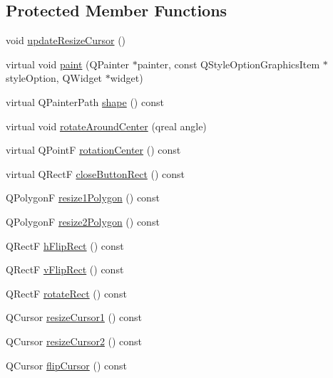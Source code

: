 \subsection*{Protected Member Functions}
\begin{DoxyCompactItemize}
\item 
void \hyperlink{class_u_b_graphics_triangle_a44af671b51e650fbe4a6b8b0c05490d5}{update\-Resize\-Cursor} ()
\item 
virtual void \hyperlink{class_u_b_graphics_triangle_a81a8a1a685d90d83734417474aea694c}{paint} (Q\-Painter $\ast$painter, const Q\-Style\-Option\-Graphics\-Item $\ast$style\-Option, Q\-Widget $\ast$widget)
\item 
virtual Q\-Painter\-Path \hyperlink{class_u_b_graphics_triangle_a3245270b719aa6dcfa30d16c999a596e}{shape} () const 
\item 
virtual void \hyperlink{class_u_b_graphics_triangle_a38e19f6246c3c232351336071972a6be}{rotate\-Around\-Center} (qreal angle)
\item 
virtual Q\-Point\-F \hyperlink{class_u_b_graphics_triangle_a5b16d87a6956152ef68dc904b4cdfff2}{rotation\-Center} () const 
\item 
virtual Q\-Rect\-F \hyperlink{class_u_b_graphics_triangle_a77e4143cf4dc0227f54cad19396cf5de}{close\-Button\-Rect} () const 
\item 
Q\-Polygon\-F \hyperlink{class_u_b_graphics_triangle_ab0db9ca924984128cf70ea0c705a5564}{resize1\-Polygon} () const 
\item 
Q\-Polygon\-F \hyperlink{class_u_b_graphics_triangle_a2904862c9e4c9efe31348c72821a78ff}{resize2\-Polygon} () const 
\item 
Q\-Rect\-F \hyperlink{class_u_b_graphics_triangle_a2e916ebdfb65d98385f82ba172e23d89}{h\-Flip\-Rect} () const 
\item 
Q\-Rect\-F \hyperlink{class_u_b_graphics_triangle_a7ccf8132bbd0649e94dc8a1d3968f19e}{v\-Flip\-Rect} () const 
\item 
Q\-Rect\-F \hyperlink{class_u_b_graphics_triangle_a19d6ee24797f5198b86b053df1896a09}{rotate\-Rect} () const 
\item 
Q\-Cursor \hyperlink{class_u_b_graphics_triangle_ac5019666dd7c88fe87b564c7777a69c7}{resize\-Cursor1} () const 
\item 
Q\-Cursor \hyperlink{class_u_b_graphics_triangle_ad016547164603986a04207359b2ebb27}{resize\-Cursor2} () const 
\item 
Q\-Cursor \hyperlink{class_u_b_graphics_triangle_aa2bc38d92b197d039526d519fd58fdca}{flip\-Cursor} () const 

\end{DoxyCompactItemize}
